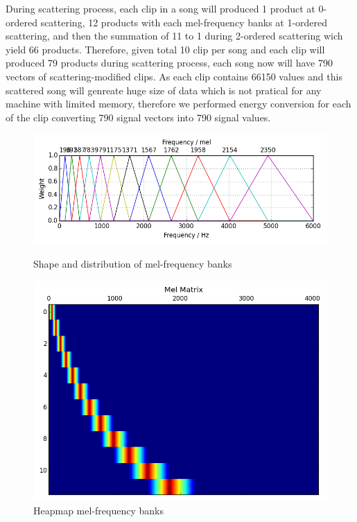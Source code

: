 \documentclass[final]{siamltexmm}
\begin{document}
During scattering process, each clip in a song will produced 1 product at 0-ordered scattering, 12 products with each mel-frequency banks at 1-ordered scattering, and then the summation of 11 to 1 during 2-ordered scattering wich yield 66 products. Therefore, given total 10 clip per song and each clip will produced 79 products during scattering process, each song now will have 790 vectors of scattering-modified clips. As each clip contains 66150 values and this scattered song will genreate huge size of data which is not pratical for any machine with limited memory, therefore we performed energy conversion for each of the clip converting 790 signal vectors into 790 signal values.

\begin{figure}[ht]
\begin{center}
  \includegraphics[scale=0.3]{mel_frequency_bank.png}
  \caption{Shape and distribution of mel-frequency banks}
  \includegraphics[scale=0.3]{Mel_Matrix.png}
  \caption{Heapmap mel-frequency banks}
\end{center}
\end{figure}
\end{document}
